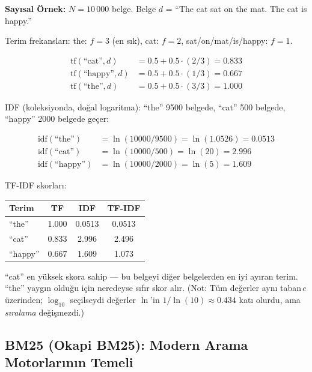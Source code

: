 \begin{ornek}
\textbf{Say{\i}sal \"{O}rnek:} $N = 10\,000$ belge. Belge $d$ = ``The cat sat on the mat. The cat is happy.''

Terim frekanslar{\i}: the: $f=3$ (en s{\i}k), cat: $f=2$, sat/on/mat/is/happy: $f=1$.

\begin{align*}
\text{tf}(\text{``cat''}, d) &= 0.5 + 0.5 \cdot (2/3) = 0.833 \\
\text{tf}(\text{``happy''}, d) &= 0.5 + 0.5 \cdot (1/3) = 0.667 \\
\text{tf}(\text{``the''}, d) &= 0.5 + 0.5 \cdot (3/3) = 1.000
\end{align*}

IDF (koleksiyonda, do\u{g}al logaritma): ``the'' 9500 belgede, ``cat'' 500 belgede, ``happy'' 2000 belgede ge\c{c}er:

\begin{align*}
\text{idf}(\text{``the''})   &= \ln(10000/9500) = \ln(1.0526) = 0.0513 \\
\text{idf}(\text{``cat''})   &= \ln(10000/500) = \ln(20) = 2.996 \\
\text{idf}(\text{``happy''}) &= \ln(10000/2000) = \ln(5) = 1.609
\end{align*}

TF-IDF skorlar{\i}:
\begin{center}
\begin{tabular}{lccc}
\toprule
\color{chapterBlue}\textbf{Terim} & \color{chapterBlue}\textbf{TF} & \color{chapterBlue}\textbf{IDF} & \color{chapterBlue}\textbf{TF-IDF} \\
\midrule
``the''   & 1.000 & 0.0513 & \color{codeRed}0.0513 \\
``cat''   & 0.833 & 2.996  & \color{codeGreen}2.496 \\
``happy'' & 0.667 & 1.609  & 1.073 \\
\bottomrule
\end{tabular}
\end{center}

``cat'' en y\"{u}ksek skora sahip --- bu belgeyi di\u{g}er belgelerden en iyi ay{\i}ran terim. ``the'' yayg{\i}n oldu\u{g}u i\c{c}in neredeyse s{\i}f{\i}r skor al{\i}r. (Not: T\"{u}m de\u{g}erler ayn{\i} taban\,$e$ \"{u}zerinden; $\log_{10}$ se\c{c}ilseydi de\u{g}erler $\ln$'in $1/\ln(10) \approx 0.434$ kat{\i} olurdu, ama \emph{s{\i}ralama} de\u{g}i\c{s}mezdi.)
\end{ornek}


\subsection{BM25 (Okapi BM25): Modern Arama Motorlar{\i}n{\i}n Temeli}
\label{subsec:bm25}

